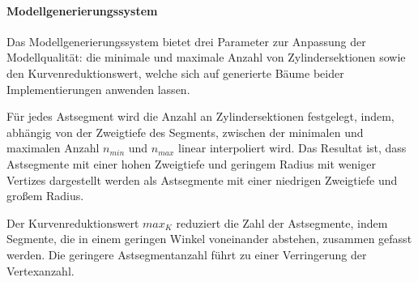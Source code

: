 \paragraph{Modellgenerierungssystem}

Das Modellgenerierungssystem bietet drei Parameter zur Anpassung der Modellqualität: die minimale und maximale Anzahl von Zylindersektionen sowie den Kurvenreduktionswert, welche sich auf generierte Bäume beider Implementierungen anwenden lassen.

Für jedes Astsegment wird die Anzahl an Zylindersektionen festgelegt, indem, abhängig von der Zweigtiefe des Segments, zwischen der minimalen und maximalen Anzahl $n_{min}$ und $n_{max}$ linear interpoliert wird. Das Resultat ist, dass Astsegmente mit einer hohen Zweigtiefe und geringem Radius mit weniger Vertizes dargestellt werden als Astsegmente mit einer niedrigen Zweigtiefe und großem Radius.

Der Kurvenreduktionswert $max_K$ reduziert die Zahl der Astsegmente, indem Segmente, die in einem geringen Winkel voneinander abstehen, zusammen gefasst werden. Die geringere Astsegmentanzahl führt zu einer Verringerung der Vertexanzahl.

